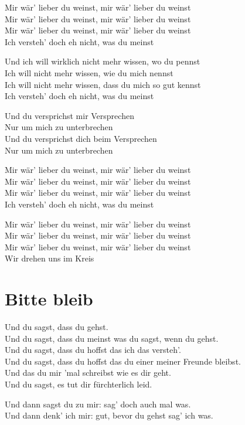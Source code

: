 \documentclass[]{book}
\begin{document}
Mir wär' lieber du weinst, mir wär' lieber du weinst\\
Mir wär' lieber du weinst, mir wär' lieber du weinst\\
Mir wär' lieber du weinst, mir wär' lieber du weinst\\
Ich versteh' doch eh nicht, was du meinst

Und ich will wirklich nicht mehr wissen, wo du pennst\\
Ich will nicht mehr wissen, wie du mich nennst\\
Ich will nicht mehr wissen, dass du mich so gut kennst\\
Ich versteh' doch eh nicht, was du meinst

Und du versprichst mir Versprechen\\
Nur um mich zu unterbrechen\\
Und du versprichst dich beim Versprechen\\
Nur um mich zu unterbrechen

Mir wär' lieber du weinst, mir wär' lieber du weinst\\
Mir wär' lieber du weinst, mir wär' lieber du weinst\\
Mir wär' lieber du weinst, mir wär' lieber du weinst\\
Ich versteh' doch eh nicht, was du meinst

Mir wär' lieber du weinst, mir wär' lieber du weinst\\
Mir wär' lieber du weinst, mir wär' lieber du weinst\\
Mir wär' lieber du weinst, mir wär' lieber du weinst\\
Wir drehen uns im Kreis

\hypertarget{bitte-bleib}{%
\section{Bitte bleib}\label{bitte-bleib}}

Und du sagst, dass du gehst.\\
Und du sagst, dass du meinst was du sagst, wenn du gehst.\\
Und du sagst, dass du hoffst das ich das versteh'.\\
Und du sagst, dass du hoffst das du einer meiner Freunde bleibst.\\
Und das du mir 'mal schreibst wie es dir geht.\\
Und du sagst, es tut dir fürchterlich leid.

Und dann sagst du zu mir: sag' doch auch mal was.\\
Und dann denk' ich mir: gut, bevor du gehst sag' ich was.
\end{document}
